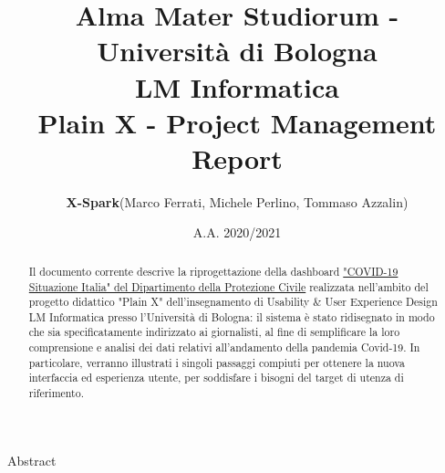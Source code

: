 \documentclass[11pt]{article}
\title{Alma Mater Studiorum - Università di Bologna \\ LM Informatica \\ \textbf{Plain X - Project Management Report}}
\author{\textbf{X-Spark}\newline(Marco Ferrati, Michele Perlino, Tommaso Azzalin)}
\date{A.A. 2020/2021}
\begin{document}
\maketitle
\clearpage

\abstractname{Abstract}

\begin{abstract}
    Il documento corrente descrive la riprogettazione della dashboard \href{https://opendatadpc.maps.arcgis.com/apps/opsdashboard/index.html#/b0c68bce2cce478eaac82fe38d4138b1}{"COVID-19 Situazione Italia" del Dipartimento della Protezione Civile} 
    realizzata nell'ambito del progetto didattico "Plain X" dell'insegnamento di Usability \& User Experience Design LM Informatica presso l'Università di Bologna: 
    il sistema è stato ridisegnato in modo che sia specificatamente indirizzato ai giornalisti, al fine di semplificare la loro comprensione e 
    analisi dei dati relativi all'andamento della pandemia Covid-19.
    In particolare, verranno illustrati i singoli passaggi compiuti per ottenere la nuova interfaccia ed esperienza utente, per soddisfare i bisogni 
    del target di utenza di riferimento. 
\end{abstract}

\tableofcontents
\clearpage


\clearpage


\clearpage


\clearpage


\clearpage


\clearpage


\clearpage
\end{document}

